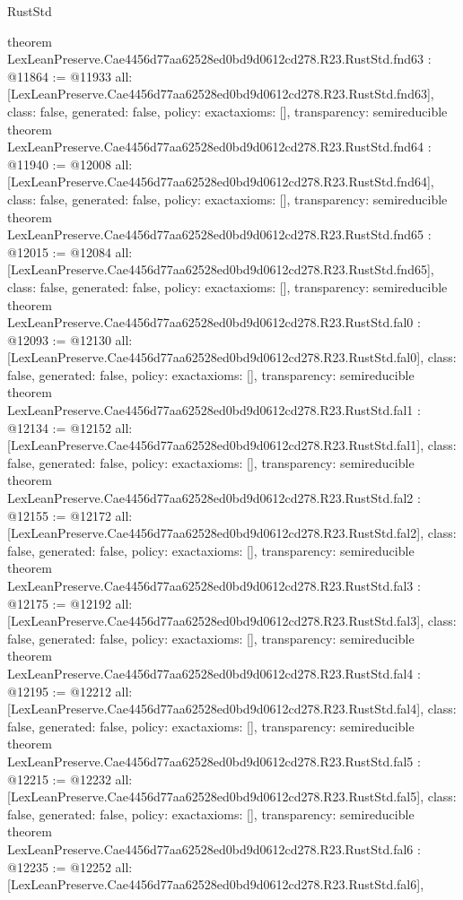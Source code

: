 \begin{lexlean}{RustStd}
\begin{coremodule}
{}
theorem LexLeanPreserve.Cae4456d77aa62528ed0bd9d0612cd278.R23.RustStd.fnd63 : @11864 := @11933 {
  all: [LexLeanPreserve.Cae4456d77aa62528ed0bd9d0612cd278.R23.RustStd.fnd63],
  class: false,
  generated: false,
  policy: exact{axioms: []},
  transparency: semireducible
}
theorem LexLeanPreserve.Cae4456d77aa62528ed0bd9d0612cd278.R23.RustStd.fnd64 : @11940 := @12008 {
  all: [LexLeanPreserve.Cae4456d77aa62528ed0bd9d0612cd278.R23.RustStd.fnd64],
  class: false,
  generated: false,
  policy: exact{axioms: []},
  transparency: semireducible
}
theorem LexLeanPreserve.Cae4456d77aa62528ed0bd9d0612cd278.R23.RustStd.fnd65 : @12015 := @12084 {
  all: [LexLeanPreserve.Cae4456d77aa62528ed0bd9d0612cd278.R23.RustStd.fnd65],
  class: false,
  generated: false,
  policy: exact{axioms: []},
  transparency: semireducible
}
theorem LexLeanPreserve.Cae4456d77aa62528ed0bd9d0612cd278.R23.RustStd.fal0 : @12093 := @12130 {
  all: [LexLeanPreserve.Cae4456d77aa62528ed0bd9d0612cd278.R23.RustStd.fal0],
  class: false,
  generated: false,
  policy: exact{axioms: []},
  transparency: semireducible
}
theorem LexLeanPreserve.Cae4456d77aa62528ed0bd9d0612cd278.R23.RustStd.fal1 : @12134 := @12152 {
  all: [LexLeanPreserve.Cae4456d77aa62528ed0bd9d0612cd278.R23.RustStd.fal1],
  class: false,
  generated: false,
  policy: exact{axioms: []},
  transparency: semireducible
}
theorem LexLeanPreserve.Cae4456d77aa62528ed0bd9d0612cd278.R23.RustStd.fal2 : @12155 := @12172 {
  all: [LexLeanPreserve.Cae4456d77aa62528ed0bd9d0612cd278.R23.RustStd.fal2],
  class: false,
  generated: false,
  policy: exact{axioms: []},
  transparency: semireducible
}
theorem LexLeanPreserve.Cae4456d77aa62528ed0bd9d0612cd278.R23.RustStd.fal3 : @12175 := @12192 {
  all: [LexLeanPreserve.Cae4456d77aa62528ed0bd9d0612cd278.R23.RustStd.fal3],
  class: false,
  generated: false,
  policy: exact{axioms: []},
  transparency: semireducible
}
theorem LexLeanPreserve.Cae4456d77aa62528ed0bd9d0612cd278.R23.RustStd.fal4 : @12195 := @12212 {
  all: [LexLeanPreserve.Cae4456d77aa62528ed0bd9d0612cd278.R23.RustStd.fal4],
  class: false,
  generated: false,
  policy: exact{axioms: []},
  transparency: semireducible
}
theorem LexLeanPreserve.Cae4456d77aa62528ed0bd9d0612cd278.R23.RustStd.fal5 : @12215 := @12232 {
  all: [LexLeanPreserve.Cae4456d77aa62528ed0bd9d0612cd278.R23.RustStd.fal5],
  class: false,
  generated: false,
  policy: exact{axioms: []},
  transparency: semireducible
}
theorem LexLeanPreserve.Cae4456d77aa62528ed0bd9d0612cd278.R23.RustStd.fal6 : @12235 := @12252 {
  all: [LexLeanPreserve.Cae4456d77aa62528ed0bd9d0612cd278.R23.RustStd.fal6],
}
\end{coremodule}
\end{lexlean}
